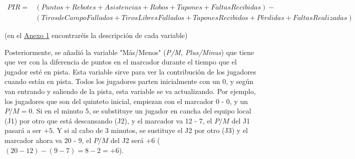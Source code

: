 \documentclass[paper=a4, fontsize=9pt]{article}
\begin{document}
\begin{equation} \label{eq1}
\begin{split}
PIR = & (Puntos + Rebotes + Asistencias + Robos + Tapones + Faltas Recibidas) - \\
& (Tiros de Campo Fallados + Tiros Libres Fallados + Tapones Recibidos + Pérdidas + Faltas Realizadas)
\end{split}
\end{equation}

\centerline{(en el \hyperref[sec:Anexo1]{Anexo 1} encontraréis la descripción de cada variable)}

\vspace{0.2cm}

Posteriormente, se añadió la variable "Más/Menos" (\emph{P/M, Plus/Minus}) que tiene que ver con la diferencia de puntos en el marcador durante el tiempo que el jugador esté en pista. Esta variable sirve para ver la contribución de los jugadores cuando están en pista. Todos los jugadores parten inicialmente con un 0, y según van entrando y saliendo de la pista, esta variable se va actualizando. Por ejemplo, los jugadores que son del quinteto inicial, empiezan con el marcador 0 - 0, y un $P/M = 0$. Si en el minuto 5, se substituye un jugador en cancha del equipo local (J1) por otro que está descansando (J2), y el marcador va 12 - 7, el $P/M$ del J1 pasará a ser $+5$. Y si al cabo de 3 minutos, se sustituye el J2 por otro (J3) y el marcador ahora va 20 - 9, el $P/M$ del J2 será $+6$ ($(20-12) - (9-7) = 8 - 2 = +6$).
\end{document}
